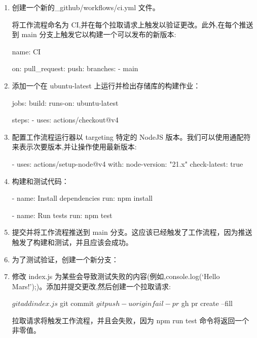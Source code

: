 \begin{enumerate}
\item 
创建一个新的\_github/workflows/ci.yml 文件。

将工作流程命名为 CI,并在每个拉取请求上触发以验证更改。此外,在每个推送到 main 分支上触发它以构建一个可以发布的新版本:

\begin{shell}
name: CI

on:
  pull_request:
  push:
    branches:
      - main
\end{shell}

\item 
添加一个在 ubuntu-latest 上运行并检出存储库的构建作业：

\begin{shell}
jobs:
  build:
    runs-on: ubuntu-latest

    steps:
      - uses: actions/checkout@v4
\end{shell}

\item 
配置工作流程运行器以 targeting 特定的 NodeJS 版本。我们可以使用通配符来表示次要版本,并让操作使用最新版本:

\begin{shell}
- uses: actions/setup-node@v4
  with:
    node-version: "21.x"
    check-latest: true
\end{shell}

\item 
构建和测试代码：

\begin{shell}
- name: Install dependencies
  run: npm install

- name: Run tests
  run: npm test
\end{shell}

\item 
提交并将工作流程推送到 main 分支。这应该已经触发了工作流程，因为推送触发了构建和测试，并且应该会成功。

\item 
为了测试验证，创建一个新分支：


\item 
修改 index.js 为某些会导致测试失败的内容(例如,console.log(‘Hello Mars!’);)。添加并提交更改,然后创建一个拉取请求:

\begin{shell}
$ git add index.js
$ git commit
$ git push -u origin fail-pr
$ gh pr create --fill
\end{shell}

拉取请求将触发工作流程，并且会失败，因为 npm run test 命令将返回一个非零值。

\end{enumerate}

